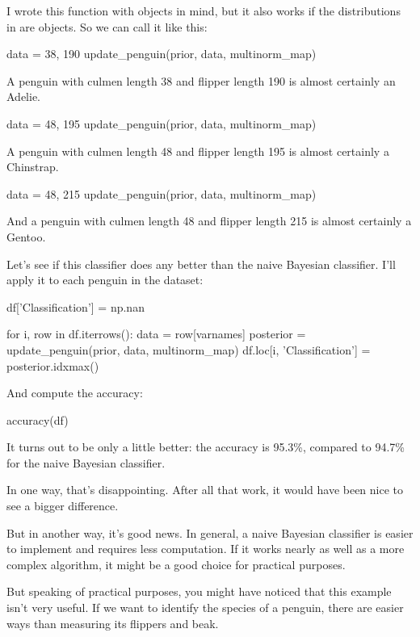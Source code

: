 \documentclass[12pt]{book}
\theoremstyle{exercise}
\begin{document}
I wrote this function with  objects in
mind, but it also works if the distributions in
 are
 objects. So we can call
it like this:

\begin{code}
data = 38, 190
update_penguin(prior, data, multinorm_map)
\end{code}

A penguin with culmen length 38 and flipper length 190 is almost
certainly an Adelie.

\begin{code}
data = 48, 195
update_penguin(prior, data, multinorm_map)
\end{code}

A penguin with culmen length 48 and flipper length 195 is almost
certainly a Chinstrap.

\begin{code}
data = 48, 215
update_penguin(prior, data, multinorm_map)
\end{code}

And a penguin with culmen length 48 and flipper length 215 is almost
certainly a Gentoo.

Let's see if this classifier does any better than the naive Bayesian
classifier. I'll apply it to each penguin in the dataset:

\begin{code}
df['Classification'] = np.nan

for i, row in df.iterrows():
    data = row[varnames]
    posterior = update_penguin(prior, data, multinorm_map)
    df.loc[i, 'Classification'] = posterior.idxmax()
\end{code}

And compute the accuracy:

\begin{code}
accuracy(df)
\end{code}

It turns out to be only a little better: the accuracy is 95.3\%,
compared to 94.7\% for the naive Bayesian classifier.

In one way, that's disappointing. After all that work, it would have
been nice to see a bigger difference.

But in another way, it's good news. In general, a naive Bayesian
classifier is easier to implement and requires less computation. If it
works nearly as well as a more complex algorithm, it might be a good
choice for practical purposes.

But speaking of practical purposes, you might have noticed that this
example isn't very useful. If we want to identify the species of a
penguin, there are easier ways than measuring its flippers and beak.
\end{document}
